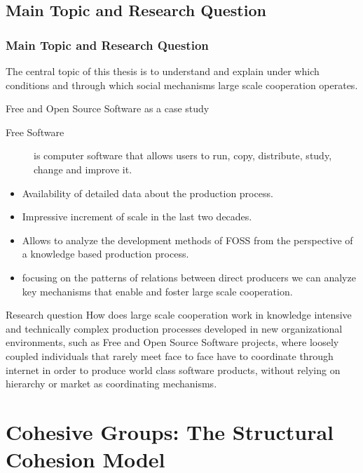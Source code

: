 \documentclass[ignorenonframetext,red,8pt,notes=hide]{beamer}
\begin{document}
\subsection{Main Topic and Research Question}
\begin{frame}[label=]
\frametitle{Main Topic and Research Question}

The central topic of this thesis is to understand and explain under which conditions and through which social mechanisms large scale cooperation operates. 

\begin{block}{Free and Open Source Software as a case study}
\begin{description}
\item[Free Software] is computer software that allows users to run, copy, distribute, study, change and improve it.  
\end{description}
\begin{itemize}
\item Availability of detailed data about the production process.
\item Impressive increment of scale in the last two decades.
\item Allows to analyze the development methods of FOSS from the perspective of a knowledge based production process.
\item focusing on the patterns of relations between direct producers we can analyze key mechanisms that enable and foster large scale cooperation.
\end{itemize}
\end{block}

\pause

\begin{block}{Research question}
How does large scale cooperation work in knowledge intensive and technically complex production processes developed in new organizational environments, such as Free and Open Source Software projects, where loosely coupled individuals that rarely meet face to face have to coordinate through internet in order to produce world class software products, without relying on hierarchy or market as coordinating mechanisms.
\end{block}
\end{frame}


\section{Cohesive Groups: The Structural Cohesion Model}
\end{document}
